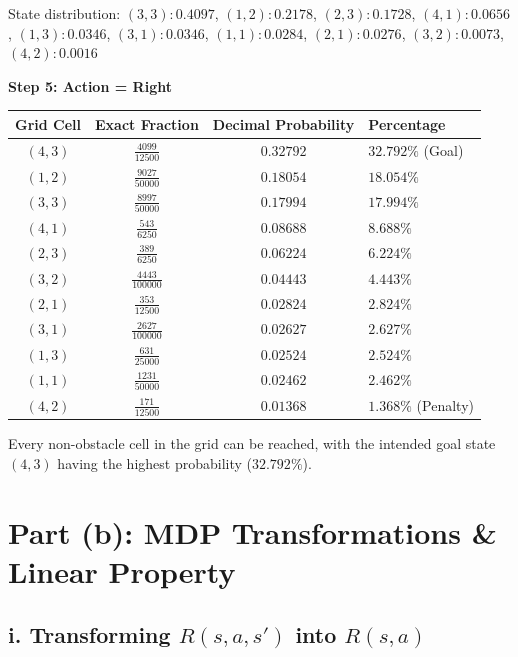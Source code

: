 \documentclass[11pt]{article}
\begin{document}
State distribution: $(3,3): 0.4097$, $(1,2): 0.2178$, $(2,3): 0.1728$, $(4,1): 0.0656$,
$(1,3): 0.0346$, $(3,1): 0.0346$, $(1,1): 0.0284$, $(2,1): 0.0276$, $(3,2): 0.0073$, $(4,2): 0.0016$

\textbf{Step 5: Action = Right}

\begin{center}
\begin{tabular}{cccl}
\toprule
Grid Cell & Exact Fraction & Decimal Probability & Percentage \\
\midrule
$(4,3)$ & $\frac{4099}{12500}$   & $0.32792$ & $32.792\%$ (Goal) \\[2pt]
$(1,2)$ & $\frac{9027}{50000}$   & $0.18054$ & $18.054\%$ \\[2pt]
$(3,3)$ & $\frac{8997}{50000}$   & $0.17994$ & $17.994\%$ \\[2pt]
$(4,1)$ & $\frac{543}{6250}$     & $0.08688$ & $8.688\%$ \\[2pt]
$(2,3)$ & $\frac{389}{6250}$     & $0.06224$ & $6.224\%$ \\[2pt]
$(3,2)$ & $\frac{4443}{100000}$  & $0.04443$ & $4.443\%$ \\[2pt]
$(2,1)$ & $\frac{353}{12500}$    & $0.02824$ & $2.824\%$ \\[2pt]
$(3,1)$ & $\frac{2627}{100000}$  & $0.02627$ & $2.627\%$ \\[2pt]
$(1,3)$ & $\frac{631}{25000}$    & $0.02524$ & $2.524\%$ \\[2pt]
$(1,1)$ & $\frac{1231}{50000}$   & $0.02462$ & $2.462\%$ \\[2pt]
$(4,2)$ & $\frac{171}{12500}$    & $0.01368$ & $1.368\%$ (Penalty) \\
\bottomrule
\end{tabular}
\end{center}

Every non-obstacle cell in the grid can be reached, with the intended goal state $(4,3)$
having the highest probability ($32.792\%$).

\section*{Part (b): MDP Transformations \& Linear Property}

\subsection*{i. Transforming $R(s, a, s')$ into $R(s, a)$}
\end{document}
